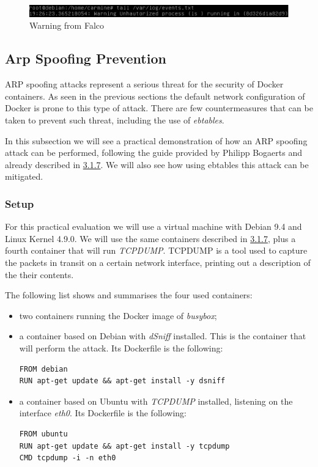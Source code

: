\documentclass[a4paper,12pt]{article}
\begin{document}
\begin{figure}[ht!]
  \centerline{\includegraphics[width=1\textwidth]{falco_warn.png}}
  \caption{Warning from Falco}
  \label{fig:falco_warn}
\end{figure}

\subsection{Arp Spoofing Prevention}

ARP spoofing attacks represent a serious threat for the security of Docker
containers. As seen in the previous sections the default network configuration
of Docker is prone to this type of attack. There are few countermeasures that
can be taken to prevent such threat, including the use of \textit{ebtables}.
\par In this subsection we will see a practical demonstration of how an ARP
spoofing attack can be performed, following the guide provided by Philipp
Bogaerts \cite{bogaerts_arpspoof} and already described in
\hyperref[sec:arpspoof_description]{3.1.7}. We will also see how using ebtables
this attack can be mitigated. 

\subsubsection{Setup}

For this practical evaluation we will use a virtual machine with Debian 9.4 and
Linux Kernel 4.9.0. We will use the same containers described in
\hyperref[sec:arpspoof_description]{3.1.7}, plus a fourth container that will
run \textit{TCPDUMP}. TCPDUMP \cite{tcpdump_man} is a tool used to capture the
packets in transit on a certain network interface, printing out a description of
the their contents. \par The following list shows and summarises the four used
containers: 
\begin{itemize}
  \item two containers running the Docker image of \textit{busybox};
  \item a container based on Debian with \textit{dSniff} installed. This is the
  container that will perform the attack. Its Dockerfile is the following:
  \begin{lstlisting}
FROM debian
RUN apt-get update && apt-get install -y dsniff
  \end{lstlisting}
  \item a container based on Ubuntu with \textit{TCPDUMP} installed, listening
  on the interface \textit{eth0}. Its Dockerfile is the following:
  \begin{lstlisting}
FROM ubuntu
RUN apt-get update && apt-get install -y tcpdump
CMD tcpdump -i -n eth0
  \end{lstlisting}
\end{itemize}
\end{document}

